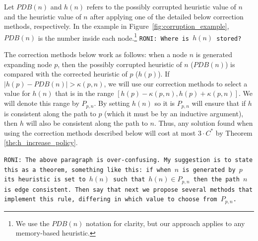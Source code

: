\documentclass{article}
\newcommand{\roni}[1]{\mbox{\tt RONI: #1}}
\begin{document}


Let $PDB(n)$ and $h(n)$ refers to the possibly corrupted heuristic value of $n$ and the heuristic value of $n$ after applying one of the detailed below correction methods, respectively. In the example in Figure~\ref{fig:corruption_example}, $PDB(n)$ is the number inside each node.\footnote{We use the $PDB(n)$ notation for clarity, but our approach applies to any memory-based heuristic.}  
\roni{Where is $h(n)$ stored?}


% 
The correction methods below work as follows: when a node $n$ is generated expanding node $p$, then the possibly corrupted heuristic of $n$  ($PDB(n)$) is compared with the corrected heuristic of $p$ ($h(p)$). If $|h(p) - PDB(n)| > \kappa(p, n)$, we will use our correction methods to select a value for $h(n)$ that is in the range $[h(p)-\kappa(p,n),h(p)+\kappa(p,n)]$.
We will denote this range by $P_{p,n}$.
By setting $h(n)$ so it is $P_{p,n}$ will ensure that if $h$ is consistent along the path to $p$ (which it must be by an inductive argument), then $h$ will also be consistent along the path to $n$. 
Thus, any solution found when using the correction methods described below will cost at most $3 \cdot C^*$  by Theorem \ref{the:h_increase_policy}.


\roni{The above paragraph is over-confusing. My suggestion is to state this as a theorem, something like this: if when $n$ is generated by $p$ its heuristic is set to $h(n)$ such that $h(n)\in P_{p,n}$ then the path $n$ is edge consistent. Then say that next we propose several methods that implement this rule, differing in which value to choose from $P_{p,n}$.} 


%
\end{document}
